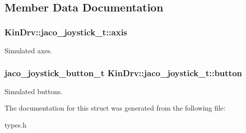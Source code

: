 \subsection{Member Data Documentation}
\hypertarget{structKinDrv_1_1jaco__joystick__t_a09ee2ead312e8ac5b4e9318a218d15eb}{
\subsubsection[{axis}]{ Kin\+Drv\+::jaco\+\_\+joystick\+\_\+t\+::axis}}\label{structKinDrv_1_1jaco__joystick__t_a09ee2ead312e8ac5b4e9318a218d15eb}
Simulated axes. \hypertarget{structKinDrv_1_1jaco__joystick__t_af1a7ba692bcd9b198dd70d962249ada0}{
\subsubsection[{button}]{\setlength{\rightskip}{0pt plus 5cm}jaco\+\_\+joystick\+\_\+button\+\_\+t Kin\+Drv\+::jaco\+\_\+joystick\+\_\+t\+::button}}\label{structKinDrv_1_1jaco__joystick__t_af1a7ba692bcd9b198dd70d962249ada0}
Simulated buttons. 

The documentation for this struct was generated from the following file\+:\begin{DoxyCompactItemize}
\item 
types.\+h\end{DoxyCompactItemize}
